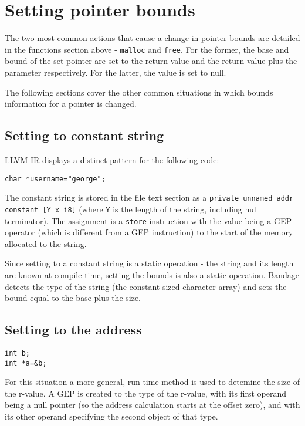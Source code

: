 \section{Setting pointer bounds}

The two most common actions that cause a change in pointer bounds are detailed in the functions section above - \verb!malloc! and \verb!free!.
For the former, the base and bound of the set pointer are set to the return value and the return value plus the parameter respectively.
For the latter, the value is set to null.

The following sections cover the other common situations in which bounds information for a pointer is changed.

\subsection{Setting to constant string}

LLVM IR displays a distinct pattern for the following code:

\begin{verbatim}
char *username="george";
\end{verbatim}

The constant string is stored in the file text section as a \verb!private unnamed_addr constant [Y x i8]! (where \verb!Y! is the length of the string, including null terminator).
The assignment is a \verb!store! instruction with the value being a GEP operator (which is different from a GEP instruction) to the start of the memory allocated to the string.

Since setting to a constant string is a static operation - the string and its length are known at compile time, setting the bounds is also a static operation.
Bandage detects the type of the string (the constant-sized character array) and sets the bound equal to the base plus the size.

\subsection{Setting to the address}

\begin{verbatim}
int b;
int *a=&b;
\end{verbatim}

For this situation a more general, run-time method is used to detemine the size of the r-value.
A GEP is created to the type of the r-value, with its first operand being a null pointer (so the address calculation starts at the offset zero), and with its other operand specifying the second object of that type.

